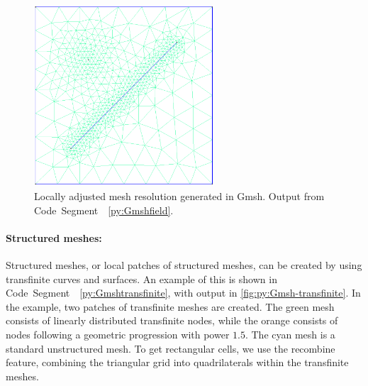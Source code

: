 \begin{figure}[htp]
    \centering
    \includegraphics[width=0.6\textwidth]{report/Images/Software/Gmsh examples/gmsh_mesh_size_fields.png}
    \caption[Adjusted mesh size generated in Gmsh]{Locally adjusted mesh resolution generated in Gmsh. Output from Code~Segment~~\ref{py:Gmshfield}.}
    \label{fig:py:Gmsh-field}
\end{figure}

\paragraph{Structured meshes:}
Structured meshes, or local patches of structured meshes, can be created by using transfinite curves and surfaces. An example of this is shown in Code~Segment~~\ref{py:Gmshtransfinite}, with output in \autoref{fig:py:Gmsh-transfinite}. In the example, two patches of transfinite meshes are created. The green mesh consists of linearly distributed transfinite nodes, while the orange consists of nodes following a geometric progression with power $1.5$. The cyan mesh is a standard unstructured mesh. To get rectangular cells, we use the recombine feature, combining the triangular grid into quadrilaterals within the transfinite meshes.

